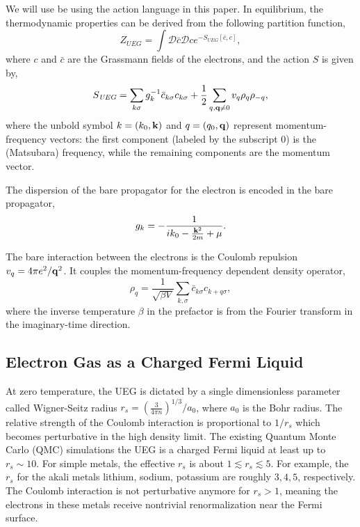 \documentclass[reprint,amsmath,amssymb,aps,prb]{revtex4-1}
\begin{document}
We will use be using the action language in this paper. In equilibrium, the thermodynamic properties can be derived from the following partition function,
\begin{equation}
    Z_{\textit{UEG}}=\int \mathcal{D}\bar{c}\mathcal{D}c e^{-S_{\textit{UEG}}[\bar{c}, c]},
\end{equation}
where $c$ and $\bar{c}$ are the Grassmann fields of the electrons, and the action $S$ is given by,
\begin{equation}
    \label{eq:ueg_action}
    S_{\textit{UEG}} = \sum_{k \sigma} g_k^{-1}\bar{c}_{k \sigma} c_{k \sigma} +\frac{1}{2}\sum_{q, \mathbf{q} \neq 0}  v_q \rho_q \rho_{-q},
\end{equation}
where the unbold symbol $k=(k_0, \mathbf{k})$ and $q=(q_0, \mathbf{q})$ represent momentum-frequency vectors: the first component (labeled by the subscript $0$) is the (Matsubara) frequency, while the remaining components are the momentum vector.

The dispersion of the bare propagator for the electron is encoded in the bare propagator,
\begin{equation}
    g_k=-\frac{1}{ik_0-\frac{\mathbf{k}^2}{2m}+\mu}.
\end{equation}

The bare interaction between the electrons is the Coulomb repulsion $v_q = 4\pi e^2/\mathbf{q}^2$. It couples the momentum-frequency dependent density operator,
\begin{equation}
    \rho_{q}=\frac{1}{\sqrt{\beta V}}\sum_{k,\sigma} \bar{c}_{k \sigma} c_{k+q \sigma},
\end{equation}
where the inverse temperature $\beta$ in the prefactor is from the Fourier transform in the imaginary-time direction.

\subsection{Electron Gas as a Charged Fermi Liquid}

At zero temperature, the UEG is dictated by a single dimensionless parameter called Wigner-Seitz radius $r_s=\left(\frac{3}{4 \pi n}\right)^{1 / 3}/a_0$, where $a_0$ is the Bohr radius. The relative strength of the Coulomb interaction is proportional to $1/r_s$ which becomes perturbative in the high density limit. The existing Quantum Monte Carlo (QMC) simulations the UEG is a charged Fermi liquid at least up to $r_s \sim 10$. For simple metals, the effective $r_s$ is about $1 \lesssim r_s \lesssim 5$. For example, the $r_s$ for the akali metals lithium, sodium, potassium are roughly $3, 4, 5$, respectively. The Coulomb interaction is not perturbative anymore for $r_s>1$, meaning the electrons in these metals receive nontrivial renormalization near the Fermi surface.
\end{document}
